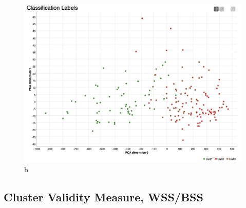 \documentclass[openany]{book}
\begin{document}
				\begin{figure}[H]
					\iftrue
					\centering
					\caption{b}
					\includegraphics[scale=0.3]{res/task1.1.nokmeans}
					\fi
				\end{figure}
			\subsection{Cluster Validity Measure, WSS/BSS}
\end{document}
